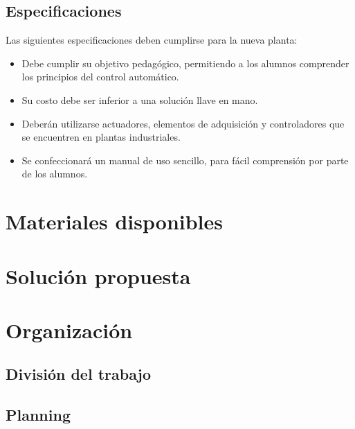 
\subsection{Especificaciones}

Las siguientes especificaciones deben cumplirse para la nueva
planta:

\begin{itemize}
\item Debe cumplir su objetivo pedagógico, permitiendo 
 a los alumnos comprender los principios del control automático.
 \item Su costo debe ser inferior a una solución llave en mano.
 \item Deberán utilizarse actuadores, elementos de adquisición
 y controladores que se encuentren en plantas industriales.
 \item Se confeccionará un manual de uso sencillo, para 
 fácil comprensión por parte de los alumnos.
\end{itemize}

\section{Materiales disponibles}
\label{sec:MaterialesDisponibles}

\section{Solución propuesta}
\label{sec:SolucionPropuesta}

\section{Organización}
\label{sec:Organizacion}
\subsection{División del trabajo}
\subsection{Planning}

